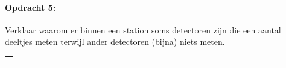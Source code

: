 \begin{minipage}[t]{1\columnwidth}%

\paragraph{Opdracht 5:}

Verklaar waarom er binnen een station soms detectoren zijn
die een aantal deeltjes meten terwijl ander detectoren (bijna) niets
meten.

\begin{tabular}{>{\raggedright}p{16.6cm}}
\tabularnewline
\hline 
\tabularnewline
\hline 
\tabularnewline
\hline 
\tabularnewline
\hline 
\end{tabular}%
\end{minipage}

